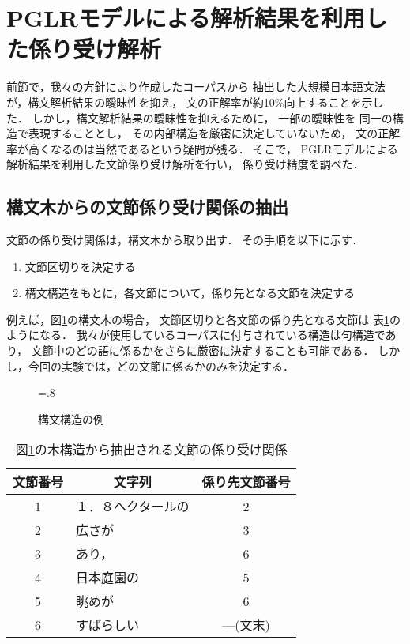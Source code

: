 \section{PGLRモデルによる解析結果を利用した係り受け解析}
\label{sec:SDDA}

前節で，我々の方針により作成したコーパスから
抽出した大規模日本語文法が，構文解析結果の曖昧性を抑え，
文の正解率が約10\%向上することを示した．
しかし，構文解析結果の曖昧性を抑えるために，
一部の曖昧性を
同一の構造で表現することとし，
その内部構造を厳密に決定していないため，
文の正解率が高くなるのは当然であるという疑問が残る．
そこで，
PGLRモデルによる解析結果を利用した文節係り受け解析を行い，
係り受け精度を調べた．



\subsection{構文木からの文節係り受け関係の抽出}
\label{sec:DepExtraction}

文節の係り受け関係は，構文木から取り出す．
その手順を以下に示す．
\begin{enumerate}
\item 文節区切りを決定する
\item 構文構造をもとに，各文節について，係り先となる文節を決定する
\end{enumerate}
例えば，図\ref{fig:example_tree}の構文木の場合，
文節区切りと各文節の係り先となる文節は
表\ref{tab:extracted_dep}のようになる．
我々が使用しているコーパスに付与されている構造は句構造であり，
文節中のどの語に係るかをさらに厳密に決定することも可能である．
しかし，今回の実験では，どの文節に係るかのみを決定する．

\begin{figure}[t]
  \centering
  \epsfxsize=.8\textwidth
  \caption{構文構造の例}
  \label{fig:example_tree}
\end{figure}

\begin{table}[tp]
  \centering
  \caption{図\protect\ref{fig:example_tree}の木構造から抽出される文節の係り受け関係}
  \begin{tabular}{|c|l|c|}\hline
    文節番号 & \multicolumn{1}{|c|}{文字列} & 係り先文節番号 \\\hline
    1 & １．８ヘクタールの & 2 \\\hline
    2 & 広さが & 3 \\\hline
    3 & あり， & 6 \\\hline
    4 & 日本庭園の & 5 \\\hline
    5 & 眺めが & 6 \\\hline
    6 & すばらしい & ---(文末) \\\hline
  \end{tabular}
  \label{tab:extracted_dep}
\end{table}

